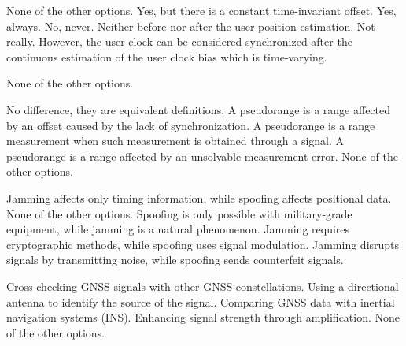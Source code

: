 \begin{questions}
    \begin{checkboxes}
        \choice None of the other options.
        \choice Yes, but there is a constant time-invariant offset.
        \choice Yes, always.
        \choice No, never. Neither before nor after the user position estimation.
        \CorrectChoice Not really. However, the user clock can be considered synchronized after the
        continuous estimation of the user clock bias which is time-varying.
    \end{checkboxes}

    \begin{checkboxes}
        \choice None of the other options.
    \end{checkboxes}


    \begin{checkboxes}
        \choice No difference, they are equivalent definitions.
        \CorrectChoice A pseudorange is a range affected by an offset caused by the lack of synchronization.
        \choice A pseudorange is a range measurement when such measurement is obtained through a signal.
        \choice A pseudorange is a range affected by an unsolvable measurement error.
        \choice None of the other options.
    \end{checkboxes}

    \begin{checkboxes}
        \choice Jamming affects only timing information, while spoofing affects positional data.
        \choice None of the other options.
        \choice Spoofing is only possible with military-grade equipment, while jamming is a natural phenomenon.
        \choice Jamming requires cryptographic methods, while spoofing uses signal modulation.
        \CorrectChoice Jamming disrupts signals by transmitting noise, while spoofing sends counterfeit signals.
    \end{checkboxes}

    \begin{checkboxes}
        \CorrectChoice Cross-checking GNSS signals with other GNSS constellations.
        \CorrectChoice Using a directional antenna to identify the source of the signal.
        \CorrectChoice Comparing GNSS data with inertial navigation systems (INS).
        \choice Enhancing signal strength through amplification.
        \choice None of the other options.
    \end{checkboxes}


\end{questions}
